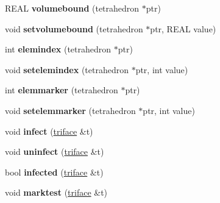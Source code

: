 \begin{DoxyCompactItemize}
\item 
\hypertarget{classtetgenmesh_acbf906f467a4da46e7f89812cef268d7}{R\-E\-A\-L {\bfseries volumebound} (tetrahedron $\ast$ptr)}\label{classtetgenmesh_acbf906f467a4da46e7f89812cef268d7}

\item 
\hypertarget{classtetgenmesh_a33453f3a5320ecc48f25630a97c5e353}{void {\bfseries setvolumebound} (tetrahedron $\ast$ptr, R\-E\-A\-L value)}\label{classtetgenmesh_a33453f3a5320ecc48f25630a97c5e353}

\item 
\hypertarget{classtetgenmesh_a0a12e21d9d363bc5aef59c1b1e51e5f2}{int {\bfseries elemindex} (tetrahedron $\ast$ptr)}\label{classtetgenmesh_a0a12e21d9d363bc5aef59c1b1e51e5f2}

\item 
\hypertarget{classtetgenmesh_a2cbb9d3c9692a5769ad8e9f20263a3ad}{void {\bfseries setelemindex} (tetrahedron $\ast$ptr, int value)}\label{classtetgenmesh_a2cbb9d3c9692a5769ad8e9f20263a3ad}

\item 
\hypertarget{classtetgenmesh_aea9c7e2e0f281f543c9215dcf4694512}{int {\bfseries elemmarker} (tetrahedron $\ast$ptr)}\label{classtetgenmesh_aea9c7e2e0f281f543c9215dcf4694512}

\item 
\hypertarget{classtetgenmesh_acb8c694d2d20e494b14b9c9f520cd5c8}{void {\bfseries setelemmarker} (tetrahedron $\ast$ptr, int value)}\label{classtetgenmesh_acb8c694d2d20e494b14b9c9f520cd5c8}

\item 
\hypertarget{classtetgenmesh_ad060b1bbcd6b0ce11367b1a4d1be9c75}{void {\bfseries infect} (\hyperlink{classtetgenmesh_1_1triface}{triface} \&t)}\label{classtetgenmesh_ad060b1bbcd6b0ce11367b1a4d1be9c75}

\item 
\hypertarget{classtetgenmesh_a3de3aa0353d41c28437b3a77cc9618f8}{void {\bfseries uninfect} (\hyperlink{classtetgenmesh_1_1triface}{triface} \&t)}\label{classtetgenmesh_a3de3aa0353d41c28437b3a77cc9618f8}

\item 
\hypertarget{classtetgenmesh_a26ecd46a8e767042b2bd0a2725ac4a89}{bool {\bfseries infected} (\hyperlink{classtetgenmesh_1_1triface}{triface} \&t)}\label{classtetgenmesh_a26ecd46a8e767042b2bd0a2725ac4a89}

\item 
\hypertarget{classtetgenmesh_a4bf3c95209d98d077cf1d9f23940e897}{void {\bfseries marktest} (\hyperlink{classtetgenmesh_1_1triface}{triface} \&t)}\label{classtetgenmesh_a4bf3c95209d98d077cf1d9f23940e897}


\end{DoxyCompactItemize}
